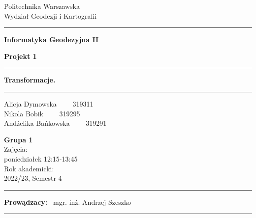 \documentclass[a4paper]{article}
\begin{document}
	
	\newpage
	\begin{titlepage}
		
		\begin{center}
			Politechnika Warszawska \\
			Wydział Geodezji i Kartografii
		\end{center}
		
		\hrule
		\vspace*{1cm}
		\begin{center}
			\Large{\textbf{Informatyka Geodezyjna II}}
		\end{center}
		
		
		\vspace*{2cm}
		\begin{center}
			\large{\textbf{Projekt 1}} 
		\end{center}
		\vspace{3cm}
		\hrule
		
		\begin{center}
			\Large{\textbf{Transformacje.}}
		\end{center}
		\hrule
		
		\vspace*{2cm}
		\begin{center}
			\large{Alicja Dymowska \ \ \ \ 319311} \\
			\large{Nikola Bobik \ \ \ \ 319295} \\
			\large{Andżelika Bańkowska \ \ \ \ 319291}
		\end{center}
		
		\vspace*{3cm}
		
		\begin{center}
			\normalsize{\textbf{Grupa 1}}\\
			\small{Zajęcia: \\poniedziałek 12:15-13:45} \\
			\small{Rok akademicki:\\ 2022/23, Semestr 4}
		\end{center}
		
		\vspace*{3cm}
		\hrule
		\begin{center}
			\large{\textbf{Prowądzacy:} \ mgr. inż. Andrzej Szeszko}
		\end{center}
		\hrule
		
	\end{titlepage}

\newpage
\end{document}
